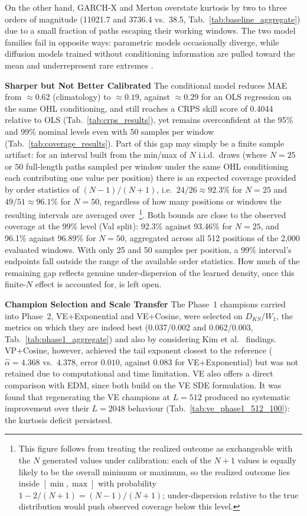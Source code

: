 On the other hand, GARCH-X and Merton overstate kurtosis by two to three orders of magnitude (11021.7 and 3736.4 vs.\ 38.5, Tab.\ \ref{tab:baseline_aggregate}) due to a small fraction of paths escaping their working windows. The two model families fail in opposite ways: parametric models occasionally diverge, while diffusion models trained without conditioning information are pulled toward the mean and underrepresent rare extremes \cite{vincent2011connection,yu2026diffusion}.

\textbf{Sharper but Not Better Calibrated} \quad The conditional model reduces MAE from \(\approx0.62\) (climatology) to \(\approx0.19\), against \(\approx0.29\) for an OLS regression on the same OHL conditioning, and still reaches a CRPS skill score of 0.4044 relative to OLS (Tab.\ \ref{tab:crps_results}), yet remains overconfident at the 95\% and 99\% nominal levels even with 50 samples per window (Tab.\ \ref{tab:coverage_results}). Part of this gap may simply be a finite sample artifact: for an interval built from the min/max of \(N\) i.i.d.\ draws (where \(N=25\) or \(50\) full-length paths sampled per window under the same OHL conditioning each contributing one value per position) there is an expected coverage provided by order statistics of \((N-1)/(N+1)\), i.e.\ \(24/26\approx92.3\%\) for \(N=25\) and \(49/51\approx96.1\%\) for \(N=50\), regardless of how many positions or windows the resulting intervals are averaged over\ \footnote{This figure follows from treating the realized outcome as exchangeable with the \(N\) generated values under calibration: each of the \(N+1\) values is equally likely to be the overall minimum or maximum, so the realized outcome lies inside \([\min,\max]\) with probability \(1-2/(N+1)=(N-1)/(N+1)\); under-dispersion relative to the true distribution would push observed coverage below this level.}. Both bounds are close to the observed coverage at the 99\% level (Val split): 92.3\% against 93.46\% for \(N=25\), and 96.1\% against 96.89\% for \(N=50\), aggregated across all 512 positions of the 2{,}000 evaluated windows. With only 25 and 50 samples per position, a 99\% interval's endpoints fall outside the range of the available order statistics. How much of the remaining gap reflects genuine under-dispersion of the learned density, once this finite-\(N\) effect is accounted for, is left open.

\textbf{Champion Selection and Scale Transfer} \quad The Phase~1 champions carried into Phase~2, VE+Exponential and VE+Cosine, were selected on \(D_{KS}\)/\(W_1\), the metrics on which they are indeed best (0.037/0.002 and 0.062/0.003, Tab.\ \ref{tab:phase1_aggregate}) and also by considering Kim et al.\ \cite{kim2025diffusion} findings. VP+Cosine, however, achieved the tail exponent closest to the reference (\(\hat{\alpha}=4.368\) vs.\ \(4.378\), error \(0.010\), against \(0.083\) for VE+Exponential) but was not retained due to computational and time limitation. VE also offers a direct comparison with EDM, since both build on the VE SDE formulation. It was found that regenerating the VE champions at \(L=512\) produced no systematic improvement over their \(L=2048\) behaviour (Tab.\ \ref{tab:ve_phase1_512_100}): the kurtosis deficit persistsed.

